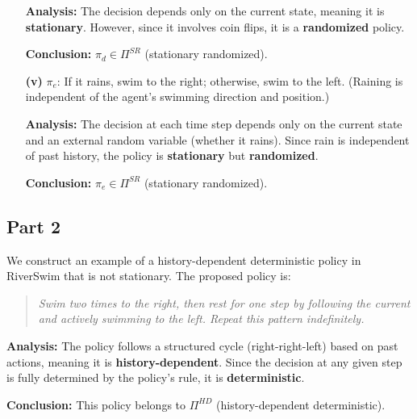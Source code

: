 \begin{enumerate}
    \textbf{Analysis:} The decision depends only on the current state, meaning it is \textbf{stationary}. However, since it involves coin flips, it is a \textbf{randomized} policy.

    \textbf{Conclusion:} \(\pi_d \in \Pi^{SR}\) (stationary randomized).

    \item[\textbf{(v)}] \(\pi_e\): If it rains, swim to the right; otherwise, swim to the left. (Raining is independent of the agent’s swimming direction and position.)

    \textbf{Analysis:} The decision at each time step depends only on the current state and an external random variable (whether it rains). Since rain is independent of past history, the policy is \textbf{stationary} but \textbf{randomized}.

    \textbf{Conclusion:} \(\pi_e \in \Pi^{SR}\) (stationary randomized).

\end{enumerate}

\subsection*{Part 2}

We construct an example of a history-dependent deterministic policy in RiverSwim that is not stationary. The proposed policy is:

\begin{quote}
\textit{Swim two times to the right, then rest for one step by following the current and actively swimming to the left. Repeat this pattern indefinitely.}
\end{quote}

\textbf{Analysis:} The policy follows a structured cycle (right-right-left) based on past actions, meaning it is \textbf{history-dependent}. Since the decision at any given step is fully determined by the policy’s rule, it is \textbf{deterministic}.

\textbf{Conclusion:} This policy belongs to \(\Pi^{HD}\) (history-dependent deterministic).